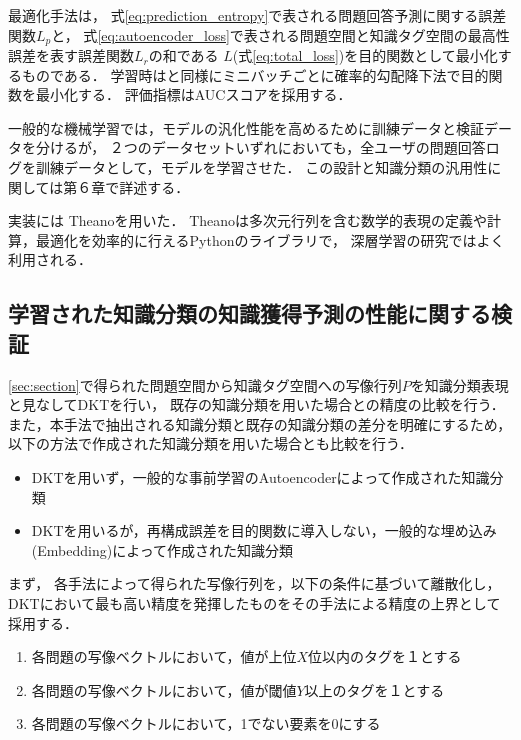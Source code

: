 最適化手法は，
式\ref{eq:prediction_entropy}で表される問題回答予測に関する誤差関数$L_p$と，
式\ref{eq:autoencoder_loss}で表される問題空間と知識タグ空間の最高性誤差を表す誤差関数$L_r$の和である
$L$(式\ref{eq:total_loss})を目的関数として最小化するものである．
学習時は\cite{piech2015deep}と同様にミニバッチごとに確率的勾配降下法で目的関数を最小化する．
評価指標はAUCスコアを採用する．

一般的な機械学習では，モデルの汎化性能を高めるために訓練データと検証データを分けるが，
２つのデータセットいずれにおいても，全ユーザの問題回答ログを訓練データとして，モデルを学習させた．
この設計と知識分類の汎用性に関しては第６章で詳述する．

実装には
Theanoを用いた\cite{bergstra+al:2010-scipy,Bastien-Theano-2012}．
Theanoは多次元行列を含む数学的表現の定義や計算，最適化を効率的に行えるPythonのライブラリで，
深層学習の研究ではよく利用される．


\subsection{学習された知識分類の知識獲得予測の性能に関する検証}

\ref{sec:section}で得られた問題空間から知識タグ空間への写像行列$P$を知識分類表現と見なしてDKTを行い，
既存の知識分類を用いた場合との精度の比較を行う．
また，本手法で抽出される知識分類と既存の知識分類の差分を明確にするため，
以下の方法で作成された知識分類を用いた場合とも比較を行う．
\begin{itemize}
\item DKTを用いず，一般的な事前学習のAutoencoderによって作成された知識分類 \label{c1}
\item DKTを用いるが，再構成誤差を目的関数に導入しない，一般的な埋め込み(Embedding)によって作成された知識分類 \label{c2}
\end{itemize}

まず，
各手法によって得られた写像行列を，以下の条件に基づいて離散化し，
DKTにおいて最も高い精度を発揮したものをその手法による精度の上界として採用する．
\begin{enumerate}
\item 各問題の写像ベクトルにおいて，値が上位$X$位以内のタグを１とする
\item 各問題の写像ベクトルにおいて，値が閾値$Y$以上のタグを１とする
\item 各問題の写像ベクトルにおいて，1でない要素を0にする
\end{enumerate}

